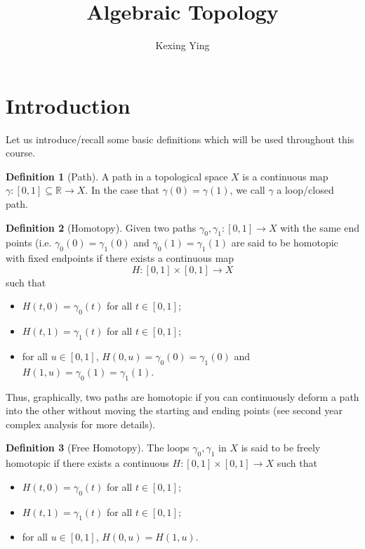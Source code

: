 \documentclass[]{article}
\title{Algebraic Topology}
\author{Kexing Ying}
\theoremstyle{definition}
\theoremstyle{definition}
\newtheorem{definition}{Definition}[section]
\begin{document}
\maketitle

{
\hypersetup{linkcolor=}
\setcounter{tocdepth}{2}
\tableofcontents
}
\newpage

\section{Introduction}

Let us introduce/recall some basic definitions which will be used throughout this 
course. 

\begin{definition}[Path]
  A path in a topological space \(X\) is a continuous map \(\gamma : [0, 1] \subseteq \mathbb{R} \to X\).
  In the case that \(\gamma(0) = \gamma(1)\), we call \(\gamma\) a loop/closed path.
\end{definition}

\begin{definition}[Homotopy]
  Given two paths \(\gamma_0, \gamma_1 : [0, 1] \to X\) with the same end points 
  (i.e. \(\gamma_0(0) = \gamma_1(0)\) and \(\gamma_0(1) = \gamma_1(1)\) are 
  said to be homotopic with fixed endpoints if there exists a continuous map 
  \[H : [0, 1] \times [0, 1] \to X\]
  such that 
  \begin{itemize}
    \item \(H(t, 0) = \gamma_0(t)\) for all \(t \in [0, 1]\);
    \item \(H(t, 1) = \gamma_1(t)\) for all \(t \in [0, 1]\);
    \item for all \(u \in [0, 1]\), 
    \(H(0, u) = \gamma_0(0) = \gamma_1(0)\) and \(H(1, u) = \gamma_0(1) = \gamma_1(1)\).
  \end{itemize}
\end{definition}

Thus, graphically, two paths are homotopic if you can continuously deform a path 
into the other without moving the starting and ending points (see second year 
complex analysis for more details).

\begin{definition}[Free Homotopy]
  The loops \(\gamma_0, \gamma_1\) in \(X\) is said to be freely homotopic if 
  there exists a continuous \(H : [0, 1] \times [0, 1] \to X\) such that 
  \begin{itemize}
    \item \(H(t, 0) = \gamma_0(t)\) for all \(t \in [0, 1]\);
    \item \(H(t, 1) = \gamma_1(t)\) for all \(t \in [0, 1]\);
    \item for all \(u \in [0, 1]\), \(H(0, u) = H(1, u)\).
  \end{itemize}
\end{definition}
\end{document}
